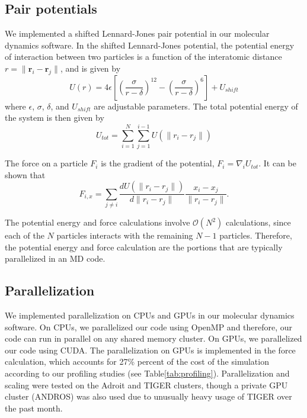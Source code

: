 \documentclass[12pt]{article}
\begin{document}
\subsection{Pair potentials} \label{subsec:potential}

We implemented a shifted Lennard-Jones pair potential in our molecular dynamics software.
%
In the shifted Lennard-Jones potential, the potential energy of interaction between two particles is a function of the interatomic distance $r = \|\mathbf{r}_i - \mathbf{r}_j \|$, and is given by
\begin{equation}
U(r) = 4 \epsilon\left[ \left( \frac{\sigma}{r-\delta} \right)^{12} - \left( \frac{\sigma}{r-\delta} \right)^6 \right] + U_{shift}
\end{equation}
where $\epsilon$, $\sigma$, $\delta$, and $U_{shift}$ are adjustable parameters.
%
The total potential energy of the system is then given by
\begin{equation}
U_{tot} = \sum_{i=1}^{N} \sum_{j=1}^{i-1} U\left( \| r_i - r_j \| \right)
\end{equation}

The force on a particle $F_i$ is the gradient of the potential, $F_i = \nabla_i U_{tot}$.
%
It can be shown that
\begin{equation}
F_{i, x} = \sum_{j \ne i} \frac{d U\left( \| r_i - r_j \| \right)}{d \| r_i - r_j \| } \frac{x_i - x_j}{\|r_i - r_j\|}.
\end{equation}

The potential energy and force calculations involve $\mathcal{O}(N^2)$ calculations, since each of the $N$ particles interacts with the remaining $N-1$ particles.
%
Therefore, the potential energy and force calculation are the portions that are typically parallelized in an MD code.

\subsection{Parallelization}

We implemented parallelization on CPUs and GPUs in our molecular dynamics software.
%
On CPUs, we parallelized our code using OpenMP and therefore, our code can run in parallel on any shared memory cluster.
%
On GPUs, we parallelized our code using CUDA.
The parallelization on GPUs is implemented in the force calculation, which accounts for 27\% percent of the cost of the simulation according to our profiling studies (see Table\ref{tab:profiling}).
%
Parallelization and scaling were tested on the Adroit and TIGER clusters, though a private GPU cluster (ANDROS) was also used due to unusually heavy usage of TIGER over the past month.
\end{document}
